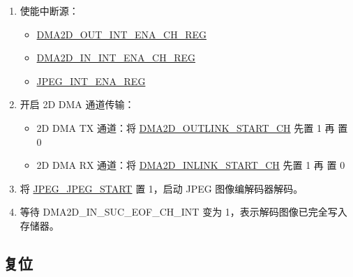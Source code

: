 \documentclass[main\_\_CN.tex]{subfiles}
\begin{document}
\begin{enumerate}
\begin{enumerate}
\begin{itemize}
            \item 2：BYTE1-0-2
            \item 3：BYTE1-2-0
            \item 4：BYTE0-2-1
            \item 5：BYTE0-1-2
        \end{itemize}
        字段配置为 5 表示翻转像素顺序，例如将 2D DMA 颜色空间转换后的 RGB 翻转为 BGR。请注意，该功能仅适用于 2D DMA RX 通道 0，不适用于其他 RX 通道。
        \item 配置 2D DMA 通道链表地址：
        \begin{itemize}
            \item 2D DMA TX 通道：\hyperref[fielddesc:DMA2DOUTLINKADDRCHN]{DMA2D\_OUTLINK\_ADDR\_CH}
            \item 2D DMA RX 通道：\hyperref[fielddesc:DMA2DINLINKADDRCHN]{DMA2D\_INLINK\_ADDR\_CH}
        \end{itemize}
    \end{enumerate}
    \item 使能中断源：
    \begin{itemize}
        \item \hyperref[regdesc:DMA2DOUTINTENACHNREG]{DMA2D\_OUT\_INT\_ENA\_CH\_REG}
        \item \hyperref[regdesc:DMA2DININTENACHNREG]{DMA2D\_IN\_INT\_ENA\_CH\_REG}
        \item \hyperref[regdesc:JPEGINTENAREG]{JPEG\_INT\_ENA\_REG}
    \end{itemize}
    \item 开启 2D DMA 通道传输：
    \begin{itemize}
        \item 2D DMA TX 通道：将 \hyperref[fielddesc:DMA2DOUTLINKSTARTCHN]{DMA2D\_OUTLINK\_START\_CH} 先置 1 再 置 0
        \item 2D DMA RX 通道：将 \hyperref[fielddesc:DMA2DINLINKSTARTCHN]{DMA2D\_INLINK\_START\_CH} 先置 1 再 置 0
    \end{itemize}
    \item 将 \hyperref[fielddesc:JPEGJPEGSTART]{JPEG\_JPEG\_START} 置 1，启动 JPEG 图像编解码器解码。
    \item 等待 DMA2D\_IN\_SUC\_EOF\_CH\_INT 变为 1，表示解码图像已完全写入存储器。
\end{enumerate}

\subsection{复位}
\end{document}
